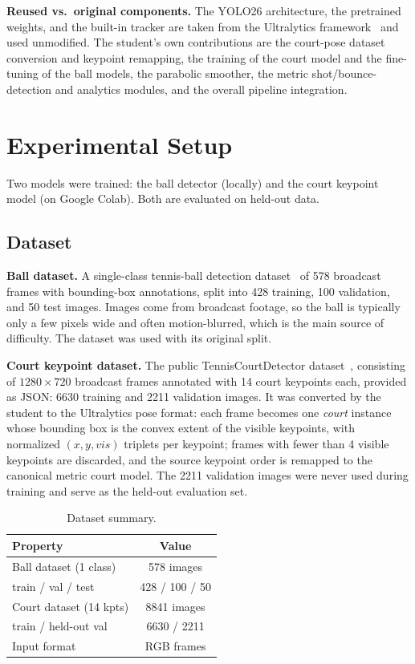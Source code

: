 \documentclass[10pt,twocolumn,a4paper]{article}
\begin{document}
	\textbf{Reused vs.\ original components.} The YOLO26 architecture, the pretrained weights, and the built-in tracker are taken from the Ultralytics framework~\cite{ultralytics_yolo} and used unmodified. The student's own contributions are the court-pose dataset conversion and keypoint remapping, the training of the court model and the fine-tuning of the ball models, the parabolic smoother, the metric shot/bounce-detection and analytics modules, and the overall pipeline integration.

	\section{Experimental Setup}

	Two models were trained: the ball detector (locally) and the court keypoint model (on Google Colab). Both are evaluated on held-out data.

	\subsection{Dataset}

	\textbf{Ball dataset.} A single-class tennis-ball detection dataset~\cite{dhanwani_tennisball} of 578 broadcast frames with bounding-box annotations, split into 428 training, 100 validation, and 50 test images. Images come from broadcast footage, so the ball is typically only a few pixels wide and often motion-blurred, which is the main source of difficulty. The dataset was used with its original split.

	\textbf{Court keypoint dataset.} The public TennisCourtDetector dataset~\cite{yastrebksv_courtdetector}, consisting of $1280\times720$ broadcast frames annotated with 14 court keypoints each, provided as JSON: 6630 training and 2211 validation images. It was converted by the student to the Ultralytics pose format: each frame becomes one \emph{court} instance whose bounding box is the convex extent of the visible keypoints, with normalized $(x, y, \mathit{vis})$ triplets per keypoint; frames with fewer than 4 visible keypoints are discarded, and the source keypoint order is remapped to the canonical metric court model. The 2211 validation images were never used during training and serve as the held-out evaluation set.

	\begin{table}[h]
		\centering
		\caption{Dataset summary.}
		\label{tab:dataset}
		\begin{tabular}{|l|c|}
			\hline
			\textbf{Property} & \textbf{Value} \\
			\hline
			Ball dataset (1 class) & 578 images \\
			\quad train / val / test & 428 / 100 / 50 \\
			Court dataset (14 kpts) & 8841 images \\
			\quad train / held-out val & 6630 / 2211 \\
			Input format & RGB frames \\
			\hline
		\end{tabular}
	\end{table}
\end{document}
